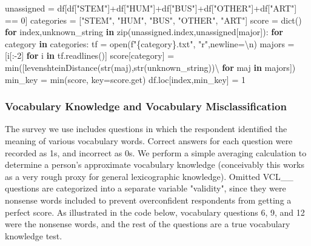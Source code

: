 \documentclass[11pt]{article}
\newenvironment{Shaded}{}{}
\newcommand{\KeywordTok}[1]{\textcolor[rgb]{0.00,0.44,0.13}{\textbf{{#1}}}}
\newcommand{\DecValTok}[1]{\textcolor[rgb]{0.25,0.63,0.44}{{#1}}}
\newcommand{\CharTok}[1]{\textcolor[rgb]{0.25,0.44,0.63}{{#1}}}
\newcommand{\StringTok}[1]{\textcolor[rgb]{0.25,0.44,0.63}{{#1}}}
\newcommand{\NormalTok}[1]{{#1}}
\newcommand{\SpecialCharTok}[1]{\textcolor[rgb]{0.25,0.44,0.63}{{#1}}}
\newcommand{\SpecialStringTok}[1]{\textcolor[rgb]{0.73,0.40,0.53}{{#1}}}
\newcommand{\ControlFlowTok}[1]{\textcolor[rgb]{0.00,0.44,0.13}{\textbf{{#1}}}}
\newcommand{\OperatorTok}[1]{\textcolor[rgb]{0.40,0.40,0.40}{{#1}}}
\newcommand{\BuiltInTok}[1]{{#1}}
\begin{document}
\begin{Shaded}
\begin{Highlighting}[]
\NormalTok{unassigned }\OperatorTok{=}\NormalTok{ df[df[}\StringTok{"STEM"}\NormalTok{]}\OperatorTok{+}\NormalTok{df[}\StringTok{"HUM"}\NormalTok{]}\OperatorTok{+}\NormalTok{df[}\StringTok{"BUS"}\NormalTok{]}\OperatorTok{+}\NormalTok{df[}\StringTok{"OTHER"}\NormalTok{]}\OperatorTok{+}\NormalTok{df[}\StringTok{"ART"}\NormalTok{] }\OperatorTok{==} \DecValTok{0}\NormalTok{]}
\NormalTok{categories }\OperatorTok{=}\NormalTok{ [}\StringTok{"STEM"}\NormalTok{, }\StringTok{"HUM"}\NormalTok{, }\StringTok{"BUS"}\NormalTok{, }\StringTok{"OTHER"}\NormalTok{, }\StringTok{"ART"}\NormalTok{]}
\NormalTok{score }\OperatorTok{=} \BuiltInTok{dict}\NormalTok{()}
\ControlFlowTok{for}\NormalTok{ index,unknown\_string }\KeywordTok{in} \BuiltInTok{zip}\NormalTok{(unassigned.index,unassigned[}\StringTok{\textquotesingle{}major\textquotesingle{}}\NormalTok{]):}
    \ControlFlowTok{for}\NormalTok{ category }\KeywordTok{in}\NormalTok{ categories:}
\NormalTok{        tf }\OperatorTok{=} \BuiltInTok{open}\NormalTok{(}\SpecialStringTok{f"}\SpecialCharTok{\{}\NormalTok{category}\SpecialCharTok{\}}\SpecialStringTok{.txt"}\NormalTok{, }\StringTok{"r"}\NormalTok{,newline}\OperatorTok{=}\StringTok{\textquotesingle{}}\CharTok{\textbackslash{}n}\StringTok{\textquotesingle{}}\NormalTok{)}
\NormalTok{        majors }\OperatorTok{=}\NormalTok{ [i[:}\OperatorTok{{-}}\DecValTok{2}\NormalTok{] }\ControlFlowTok{for}\NormalTok{ i }\KeywordTok{in}\NormalTok{ tf.readlines()]}
\NormalTok{        score[category] }\OperatorTok{=} \BuiltInTok{min}\NormalTok{([levenshteinDistance(}\BuiltInTok{str}\NormalTok{(maj),}\BuiltInTok{str}\NormalTok{(unknown\_string))}\OperatorTok{\textbackslash{}}
\ControlFlowTok{	for}\NormalTok{ maj }\KeywordTok{in}\NormalTok{ majors])}
\NormalTok{    min\_key }\OperatorTok{=} \BuiltInTok{min}\NormalTok{(score, key}\OperatorTok{=}\NormalTok{score.get)}
\NormalTok{    df.loc[index,min\_key] }\OperatorTok{=} \DecValTok{1}
\end{Highlighting}
\end{Shaded}

\hypertarget{vocabulary_knowledge-vocabulary_misclassification}{%
\subsubsection*{Vocabulary Knowledge and
Vocabulary Misclassification}\label{vocabulary_knowledge-vocabulary_misclassification}}

The survey we use includes questions in which the respondent identified
the meaning of various vocabulary words. Correct answers for each
question were recorded as 1s, and incorrect as 0s. We perform a simple
averaging calculation to determine a person's approximate vocabulary
knowledge (conceivably this works as a very rough proxy for general
lexicographic knowledge). Omitted VCL\_\_ questions are categorized
into a separate variable "validity", since they were nonsense words
included to prevent overconfident respondents from getting a perfect score.
As illustrated in the code below, vocabulary questions 6, 9, and 12 were the
nonsense words, and the rest of the questions are a true vocabulary knowledge
test.
\end{document}
